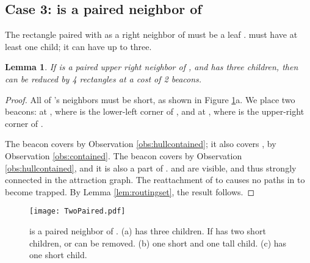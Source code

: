 \documentclass{article}
\newtheorem{lemma}{Lemma}
\begin{document}
	\subsection{Case 3:  is a paired neighbor of }
			\label{sec:atwopaired} 
		The rectangle paired with  as a right neighbor of  must be a leaf
		.
		 must have at least one child; it can have up to three.
		
		\begin{lemma}\label{lem:twopairedthree}
			If  is a paired upper right neighbor of , and  has three
			children, then  can be reduced by 4 rectangles at a cost of 2 beacons.
		\end{lemma}
		\begin{proof}
			All of 's neighbors must be short, as shown in Figure
			\ref{fig:twopaired}a.
			We place two beacons:  at , where  is
			the lower-left corner of , and  at ,
			where  is the upper-right corner of .
	
			The beacon  covers  by Observation \ref{obs:hullcontained};
			it also covers , by Observation \ref{obs:contained}.
			The beacon  covers  by Observation \ref{obs:hullcontained}, and
			it is also a part of .
			 and  are visible, and thus
			strongly connected in the attraction graph.  
			The reattachment of  to  causes no paths in  to become
			trapped. By Lemma \ref{lem:routingset}, the result follows.
		\end{proof} 
		
		\begin{figure}[htbp] 
			\begin{center}
				\texttt{[image: TwoPaired.pdf]} 
			\end{center}
			\caption{ 
				 is a paired neighbor of .
				(a)  has three children. If  has two short children,
				 or  can be removed.
				(b)  one short and one tall child. 
				(c)  has one short child.
			}
			\label{fig:twopaired}
		\end{figure}
		
\end{document}

